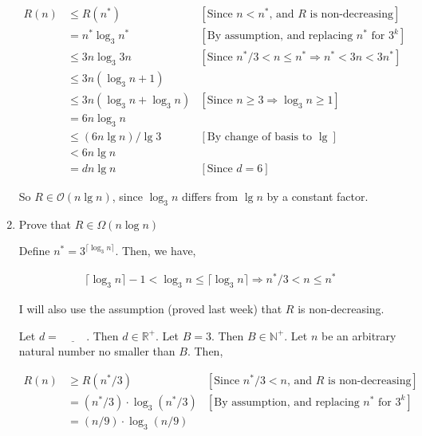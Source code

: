 \documentclass[12pt]{article}
\begin{document}
\begin{mdframed}
\begin{enumerate}[1.]
        \begin{mdframed}
        \begin{align}
        R(n) &\leq R(n^*)  & [\text{Since $n < n^*$, and $R$ is non-decreasing}]\\
        &= n^* \log_3 n^* & [\text{By assumption, and replacing $n^*$ for $3^k$}]\\
        &\leq 3n \log_3 3n  & [\text{Since $n^*/3 < n \leq n^* \Rightarrow n^* < 3n < 3n^*$}]\\
        &\leq 3n(\log_3 n + 1)\\
        &\leq 3n(\log_3 n + \log_3 n) & [\text{Since $n \geq 3 \Rightarrow \log_3 n \geq 1$}]\\
        &= 6n \log_3 n\\
        &\leq (6n \lg n)/\lg 3 & [\text{By change of basis to $\lg$}]\\
        &< 6n \lg n\\
        &= dn \lg n & [\text{Since $d = 6$}]
        \end{align}

        \end{mdframed}

        So $R \in \mathcal{O}(n \lg n)$, since $\log_3 n$ differs from $\lg n$ by a constant factor.

        \item Prove that $R \in \Omega(n \log n)$

        \begin{mdframed}

        Define $n^* = 3^{\lceil \log_3 n \rceil}$. Then, we have,

        \begin{align}
            \lceil \log_3 n \rceil - 1 < \log_3 n \leq \lceil \log_3 n \rceil \Rightarrow n^*/3 < n \leq n^*
        \end{align}

        I will also use the assumption (proved last week) that $R$ is non-decreasing.

        \bigskip

        Let $d = \underline{\hspace{1cm}}$. Then $d \in \mathbb{R}^+$. Let $B = 3$. Then $B \in \mathbb{N}^+$. Let
        $n$ be an arbitrary natural number no smaller than $B$. Then,

        \begin{align}
        R(n) &\geq R(n^*/3) & [\text{Since $n^*/3 < n$, and $R$ is non-decreasing}]\\
        &= (n^*/3) \cdot \log_3 (n^*/3) & [\text{By assumption, and replacing $n^*$ for $3^k$}]\\
        &= (n/9) \cdot \log_3 (n/9)
        \end{align}

        \end{mdframed}
    \end{enumerate}

\end{mdframed}
\end{document}
